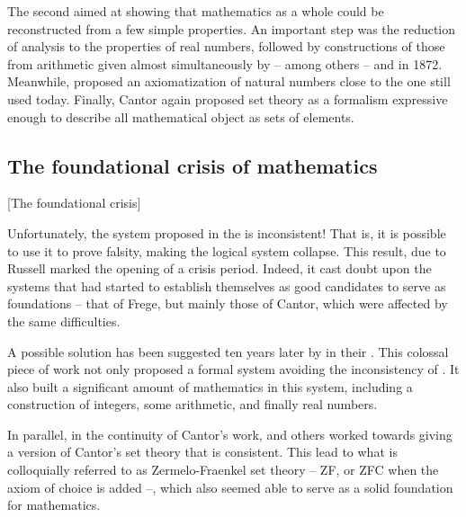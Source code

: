 The second aimed at showing that mathematics as a whole could be reconstructed from a
few simple properties. An important step was the reduction of analysis to the properties
of real numbers, followed by constructions of those from arithmetic given almost
simultaneously by – among others –  and
 in 1872.
Meanwhile,  proposed an axiomatization of natural numbers close to the
one still used today. Finally, Cantor again proposed set theory 
as a formalism expressive enough to describe all mathematical object as sets of elements.

\subsection{The foundational crisis of mathematics}[The foundational crisis]

Unfortunately, the system proposed in the  is inconsistent!
That is, it is possible to use it to prove falsity,
making the logical system collapse.%
This result, due to Russell%
%
marked the opening of a crisis period.
Indeed, it cast doubt upon the systems that had started to establish
themselves as good candidates to serve as foundations – that of Frege, but
mainly those of Cantor, which were affected by the same difficulties.

A possible solution has been suggested ten years later  by \citeauthor{Whitehead1913} in their
 . This colossal piece of work
not only proposed a formal system avoiding the inconsistency
of . It also built a significant amount
of mathematics in this system, including a construction of integers,
some arithmetic, and finally real numbers.

In parallel, in the continuity of Cantor’s work,  and others
worked towards giving a version of Cantor’s set theory that is consistent. This lead to what
is colloquially referred to as Zermelo-Fraenkel set theory – ZF, or ZFC when the
axiom of choice%
 is added –, which also seemed able to serve as a
solid foundation for mathematics.

